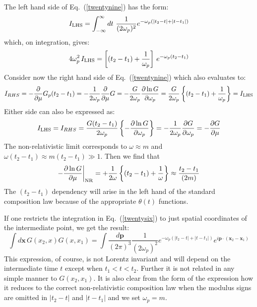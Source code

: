 \documentclass[12pt]{article}
\def\eq#1{{Eq.~(\ref{#1})}}
\begin{document}
The left hand side of \eq{twentynine} has the form:
\begin{equation}
I_{\rm LHS}    = \int_{-\infty}^\infty dt\  \frac{1}{(2\omega_p)^2} e^{-\omega_p(|t_2 -t| + |t-t_1|)}
\end{equation}
which, on integration, gives:
\begin{equation}
 4\omega_p^2 \, I_{\rm LHS} = \left[ (t_2 - t_1) + \frac{1}{\omega_p} \right] \, e^{-\omega_p(t_2 -t_1)}
\end{equation} 
Consider now the right hand side of \eq{twentynine} which also evaluates to:
\begin{equation}
 I_{RHS} = -\frac{\partial}{\partial \mu} G_p(t_2 - t_1) = -  \frac{1}{2\omega_p}\frac{\partial}{\partial \mu} G = - \frac{G}{2\omega_p} \frac{\partial \ln G}{\partial \omega_p}
 =\frac{G}{2\omega_p} \left\{ (t_2-t_1) + \frac{1}{\omega_p}\right\}= I_{\rm LHS}
\end{equation}
Either side can also be expressed as:
\begin{equation}
 I_{\rm LHS} =  I_{RHS}=\frac{G(t_2-t_1)}{2\omega_p} \left\{ -\frac{\partial \ln G}{\partial \omega_p}\right\} = - \frac{1}{2\omega_p}\frac{\partial G}{\partial \omega_p} = - \frac{\partial G}{\partial \mu}
\end{equation} 
The non-relativistic limit corresponds to $\omega\approx m$ and $\omega(t_2-t_1)\approx m(t_2-t_1)\gg 1$. Then we find that
\begin{equation}
 -\frac{\partial \ln G}{\partial \mu} \bigg|_{\rm NR} = + \frac{1}{2\omega}  \left\{ (t_2-t_1) + \frac{1}{\omega}\right\}
 \approx \frac{t_2 - t_1}{(2m)}
\end{equation} 
The $(t_2-t_1)$ dependency will arise in the left hand of the standard composition law because of the appropriate $\theta(t)$ functions.

If one restricts the integration in \eq{twentysix} to just spatial coordinates of the intermediate point, we get the result:
\begin{equation}
 \int d\bm x \, G (x_2,x) G (x,x_1) = \int\frac{d\bm p}{(2\pi)^3} 
 \frac{1}{(2\omega_p)^2} e^{-\omega_p(|t_2 -t| + |t-t_1|)}e^{i\bm p\cdot(\bm x_2-\bm x_1)}
 \end{equation} 
This expression, of course, is not Lorentz invariant and will depend on the intermediate time $t$ except when $t_1<t<t_2$. Further it is not related in any simple manner to $G(x_2,x_1)$. It is also clear from the form of the expression how it reduces to the correct non-relativistic composition law when the modulus signs are omitted in $|t_2 -t|$ and $|t-t_1|$ and we set $\omega_p=m$.
\end{document}
